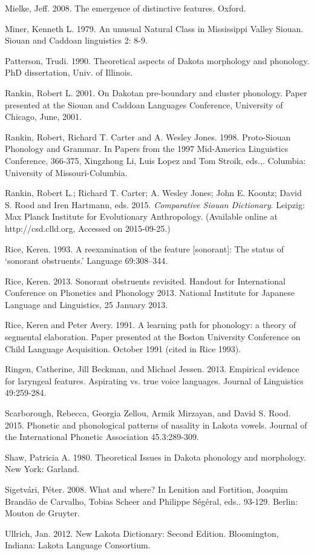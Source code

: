 \documentclass[output=paper]{LSP/langsci}
\begin{document}
\begin{reflist}
Mielke, Jeff. 2008. The emergence of distinctive features. Oxford.

Miner, Kenneth L. 1979. An unusual Natural Class in Mississippi Valley Siouan. Siouan and Caddoan linguistics 2: 8-9.

Patterson, Trudi. 1990. Theoretical aspects of Dakota morphology and phonology. PhD dissertation, Univ. of Illinois.

Rankin, Robert L. 2001. On Dakotan pre-boundary and cluster phonology. Paper presented at the Siouan and Caddoan Languages Conference, University of Chicago, June, 2001.

Rankin, Robert, Richard T. Carter and A. Wesley Jones. 1998. Proto-Siouan Phonology and Grammar. In Papers from the 1997 Mid-America Linguistics Conference, 366-375, Xingzhong Li, Luis Lopez and Tom Stroik, eds.,. Columbia: University of Missouri-Columbia.

Rankin, Robert L.; Richard T. Carter; A. Wesley Jones; John E. Koontz; David S. Rood and Iren Hartmann, eds. 2015. \textit{Comparative Siouan Dictionary}. Leipzig: Max Planck Institute for Evolutionary Anthropology. (Available online at http://csd.clld.org, Accessed on 2015-09-25.) 

Rice, Keren. 1993. A reexamination of the feature [sonorant]: The status of `sonorant obstruents.' Language 69:308--344.

Rice, Keren. 2013. Sonorant obstruents revisited. Handout for International Conference on Phonetics and Phonology 2013. National Institute for Japanese Language and Linguistics, 25 January 2013.

Rice, Keren and Peter Avery. 1991. A learning path for phonology: a theory of segmental elaboration. Paper presented at the Boston University Conference on Child Language Acquisition. October 1991 (cited in Rice 1993).

Ringen, Catherine, Jill Beckman, and Michael Jessen. 2013. Empirical evidence for laryngeal features. Aspirating vs. true voice languages. Journal of Linguistics 49:259-284.

Scarborough, Rebecca, Georgia Zellou, Armik Mirzayan, and David S. Rood. 2015. Phonetic and phonological patterns of nasality in Lakota vowels. Journal of the International Phonetic Association 45.3:289-309.

Shaw, Patricia A. 1980. Theoretical Issues in Dakota phonology and morphology. New York: Garland.

Sigetv\'ari, P\'eter. 2008. What and where? In Lenition and Fortition, Joaquim Brand\~{a}o de Carvalho, Tobias Scheer and Philippe S\'eg\'eral, eds.. 93-129. Berlin: Mouton de Gruyter.

Ullrich, Jan. 2012. New Lakota Dictionary: Second Edition. Bloomington, Indiana: Lakota Language Consortium.

\end{reflist}
\end{document}
